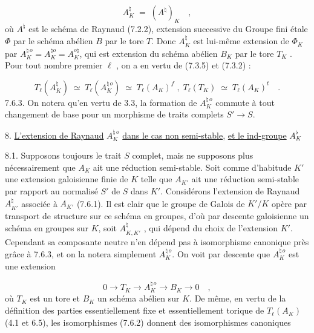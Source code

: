 \begin{equation}\tag{7.6.1}
A_K^{\natural} \;=\; (A^{\natural})_K \quad ,
\end{equation}
où $A^{\natural}$ est le schéma de Raynaud (7.2.2), extension successive du Groupe fini étale $\Phi$ par le schéma abélien $B$ par le tore $T$. Donc $A_K^{\natural}$ est lui-même extension de $\Phi_K$ par $A_K^{\natural\,o} = A^{\natural o}_K = A^{o\natural}_K$, qui est extension du schéma abélien $B_K$ par le tore $T_K$ . Pour tout nombre premier $\ell$ , on a en vertu de (7.3.5) et (7.3.2) :

\begin{equation}\tag{7.6.2}
T_{\ell}(A_K^{\natural}) \;\simeq\; T_{\ell}(A_K^{\natural\,o}) \;\simeq\; T_{\ell}(A_K)^{f} \; , \; T_{\ell}(T_K) \;\simeq\; T_{\ell}(A_K)^{t} \quad .
\end{equation}
7.6.3. On notera qu'en vertu de 3.3, la formation de $A_K^{\natural\,o}$ commute à tout changement de base pour un morphisme de traits complets $S' \longrightarrow S$.




8. \underline{L'extension de Raynaud} $A_K^{\natural\,o}$ \underline{dans le cas non semi-stable}, \underline{et le ind-groupe} $A_K^{\flat}$

8.1. Supposons toujours le trait $S$ complet, mais ne supposons plus nécessairement que $A_K$ ait une réduction semi-stable. Soit comme d'habitude $K'$ une extension galoisienne finie de $K$ telle que $A_{K'}$ ait une réduction semi-stable par rapport au normalisé $S'$ de $S$ dans $K'$. Considérons l'extension de Raynaud $A_{K'}^{\natural}$ associée à $A_{K'}$ (7.6.1). Il est clair que le groupe de Galois de $K'/K$ opère par transport de structure sur ce schéma en groupes, d'où par descente galoisienne un schéma en groupes sur $K$, soit $A_{K,K'}^{\natural}$ , qui dépend du choix de l'extension $K'$. Cependant sa composante neutre n'en dépend pas à isomorphisme canonique près grâce à 7.6.3, et on la notera simplement $A_K^{\natural\,o}$. On voit par descente que $A_K^{\natural\,o}$ est une extension

\begin{equation}\tag{8.1.1}
0 \longrightarrow T_K \longrightarrow A_K^{\natural\,o} \longrightarrow B_K \longrightarrow 0 \quad ,
\end{equation}
où $T_K$ est un tore et $B_K$ un schéma abélien sur $K$. De même, en vertu de la définition des parties essentiellement fixe et essentiellement torique de $T_{\ell}(A_K)$ (4.1 et 6.5), les isomorphismes (7.6.2) donnent des isomorphismes canoniques

